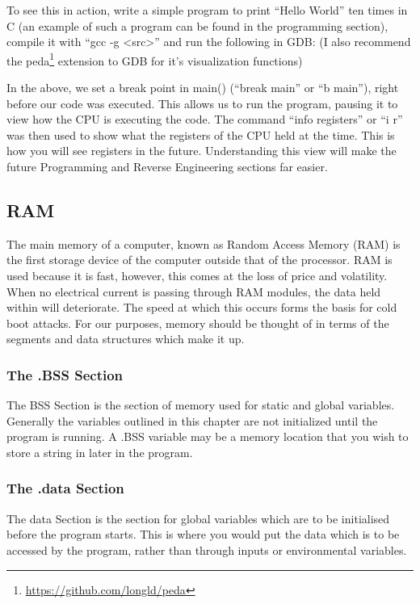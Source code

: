 				To see this in action, write a simple program to print ``Hello World'' ten times in C (an example of such a program can be found in the programming section), %
				compile it with ``gcc -g <src>'' and run the following in GDB: (I also recommend the peda\footnote{\url{https://github.com/longld/peda}} extension to GDB for it's visualization functions)				
				
				In the above, we set a break point in main() (``break main'' or ``b main''), right before our code was executed. 
				This allows us to run the program, pausing it to view how the CPU is executing the code. 
				The command ``info registers'' or ``i r'' was then used to show what the registers of the CPU held at the time.
				This is how you will see registers in the future. 
				Understanding this view will make the future Programming and Reverse Engineering sections far easier. %



				\subsection{RAM}
					The main memory of a computer, known as Random Access Memory (RAM) is the first storage device of the computer outside that of the processor. 
					RAM is used because it is fast, however, this comes at the loss of price and volatility. 
					When no electrical current is passing through RAM modules, the data held within will deteriorate. 
					The speed at which this occurs forms the basis for cold boot attacks. %
					For our purposes, memory should be thought of in terms of the segments and data structures which make it up. 
					\subsubsection{The .BSS Section}
						The BSS Section is the section of memory used for static and global variables. 
						Generally the variables outlined in this chapter are not initialized until the program is running. 
						A .BSS variable may be a memory location that you wish to store a string in later in the program. 
					\subsubsection{The .data Section}
						The data Section is the section for global variables which are to be initialised before the program starts. 
						This is where you would put the data which is to be accessed by the program, rather than through inputs or environmental variables. 
